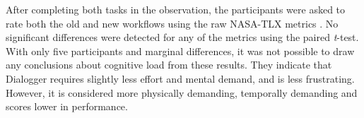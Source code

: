 
After completing both tasks in the observation, the participants were asked to
rate both the old and new workflows using the raw NASA-TLX metrics
\citep{Hart1988}.
No significant differences were detected for any of the metrics using the paired \textit{t}-test.
With only five participants and marginal differences, it was not possible to
draw any conclusions about cognitive load from these results.  They indicate
that Dialogger requires slightly less effort and mental demand, and is less
frustrating.
However, it is considered more physically demanding, temporally
demanding and scores lower in performance.



